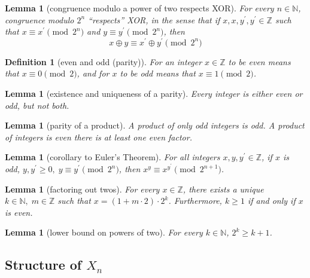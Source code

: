 \documentclass[1gpt]{article}
\theoremstyle{break}
\newtheorem{lemma}[theorem]{Lemma}
\newtheorem{definition}[theorem]{Definition}
\newcommand{\xor}{\oplus}
\begin{document}
\begin{lemma}[congruence modulo a power of two respects XOR]
    \label{lem:xor-mod}
    For every $n \in \mathbb{N}$, congruence modulo $2^n$ ``respects'' XOR, in
    the sense that if $x, x, y^\prime, y^\prime \in \mathbb{Z}$ such that $x
    \equiv x^\prime \pmod{2^n}$ and $y \equiv y^\prime \pmod{2^n}$, then $$ x
    \xor y \equiv x^\prime \xor y^\prime \pmod{2^n} $$
\end{lemma}

\begin{definition}[even and odd (parity)]
    \label{def:parity}
    For an integer $x \in \mathbb{Z}$ to be even means that $x \equiv 0
    \pmod{2}$, and for $x$ to be odd means that $x \equiv 1 \pmod{2}$.
\end{definition}

\begin{lemma}[existence and uniqueness of a parity]
    \label{lem:parity}
    Every integer is either even or odd, but not both.
\end{lemma}

\begin{lemma}[parity of a product]
    \label{lem:product-parity}
    A product of only odd integers is odd. A product of integers is even there
    is at least one even factor.
\end{lemma}

\begin{lemma}[corollary to Euler's Theorem]
    \label{lem:euler}
    For all integers $x, y, y^\prime \in \mathbb{Z}$, if $x$ is odd, $y,
    y^\prime \geq 0,\; y \equiv y^\prime \pmod{2^n}$, then $x^{y} \equiv
    x^{y^\prime} \pmod{2^{n+1}}$.
\end{lemma}

\begin{lemma}[factoring out twos]
    \label{lem:2fac}
    For every $x \in \mathbb{Z}$, there exists a unique $k \in \mathbb{N},\; m
    \in \mathbb{Z}$ such that $x = (1 + m \cdot 2) \cdot 2^k$. Furthermore, $k
    \geq 1$ if and only if $x$ is even.
\end{lemma}

\begin{lemma}[lower bound on powers of two]
    \label{lem:2pow}
    For every $k \in \mathbb{N}$, $2^k \geq k + 1$.
\end{lemma}

\subsection{Structure of \texorpdfstring{$X_n$}{Xn}}
\end{document}
